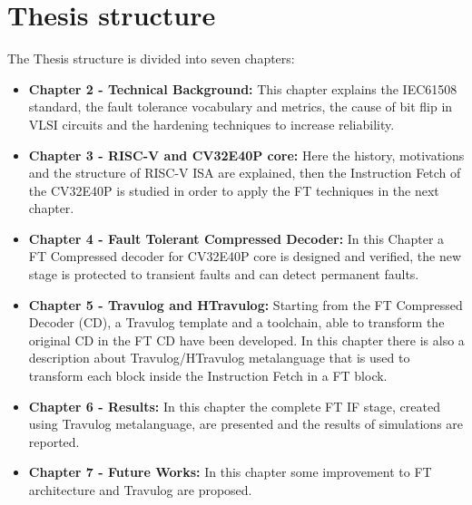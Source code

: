 {	\section{Thesis structure}{
        \label{sec:ThesisStructure} 
	    The Thesis structure is divided into seven chapters:
	    \begin{itemize}
	        \item \textbf{Chapter 2 - Technical Background:} This chapter explains the IEC61508 standard, the fault tolerance vocabulary and metrics, the cause of bit flip in VLSI circuits and the hardening techniques to increase reliability.
	        \item \textbf{Chapter 3 - RISC-V and CV32E40P core:} Here the history, motivations and the structure of RISC-V ISA are explained, then the Instruction Fetch of the CV32E40P is studied in order to apply the FT techniques in the next chapter.
	        \item \textbf{Chapter 4 - Fault Tolerant Compressed Decoder:} In this Chapter a FT Compressed decoder for CV32E40P core is designed and verified, the new stage is protected to transient faults and can detect permanent faults. 
	        \item \textbf{Chapter 5 - Travulog and HTravulog:} Starting from the FT Compressed Decoder (CD), a Travulog template and a toolchain, able to transform the original CD in the FT CD have been developed. In this chapter there is also a description about Travulog/HTravulog metalanguage that is used to transform each block inside the Instruction Fetch in a FT block.
	        \item \textbf{Chapter 6 - Results:} In this chapter the complete FT IF stage, created using Travulog metalanguage, are presented and the results of simulations are reported.
	        \item \textbf{Chapter 7 - Future Works:} In this chapter some improvement to FT architecture and Travulog are proposed.
	    \end{itemize}
	}
}



%




